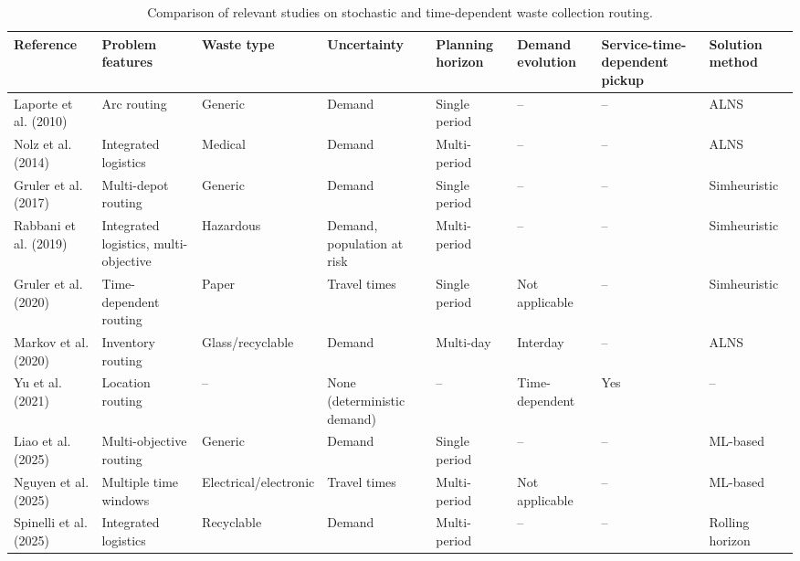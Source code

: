 \documentclass[authoryear,preprint,12pt]{elsarticle}
\renewcommand{\arraystretch}{0.70}
\begin{document}
\begin{table}
\centering
\caption{Comparison of relevant studies on stochastic and time-dependent waste collection routing.}
\label{tab:literature}
\scriptsize
\renewcommand{\arraystretch}{1.25}
\setlength{\tabcolsep}{4pt}

\begin{tabular}{p{2.7cm} p{3.2cm} p{2.1cm} p{2.2cm} p{1.7cm} p{2.2cm} p{1.8cm} p{2.0cm}}
\toprule
\textbf{Reference} &
\textbf{Problem features} &
\textbf{Waste type} &
\textbf{Uncertainty} &
\textbf{Planning horizon} &
\textbf{Demand evolution} &
\textbf{Service-time-dependent pickup} &
\textbf{Solution method} \\
\midrule

Laporte et al. (2010) &
Arc routing &
Generic &
Demand &
Single period &
-- &
-- &
ALNS \\

Nolz et al. (2014) &
Integrated logistics &
Medical &
Demand &
Multi-period &
-- &
-- &
ALNS \\

Gruler et al. (2017) &
Multi-depot routing &
Generic &
Demand &
Single period &
-- &
-- &
Simheuristic \\

Rabbani et al. (2019) &
Integrated logistics, multi-objective &
Hazardous &
Demand, population at risk &
Multi-period &
-- &
-- &
Simheuristic \\

Gruler et al. (2020) &
Time-dependent routing &
Paper &
Travel times &
Single period &
Not applicable &
-- &
Simheuristic \\

Markov et al. (2020) &
Inventory routing &
Glass/recyclable &
Demand &
Multi-day &
Interday &
-- &
ALNS \\

Yu et al. (2021) &
Location routing &
-- &
None (deterministic demand) &
-- &
Time-dependent &
Yes &
-- \\

Liao et al. (2025) &
Multi-objective routing &
Generic &
Demand &
Single period &
-- &
-- &
ML-based \\

Nguyen et al. (2025) &
Multiple time windows &
Electrical/electronic &
Travel times &
Multi-period &
Not applicable &
-- &
ML-based \\

Spinelli et al. (2025) &
Integrated logistics &
Recyclable &
Demand &
Multi-period &
-- &
-- &
Rolling horizon \\


\end{tabular}
\end{table}
\end{document}
